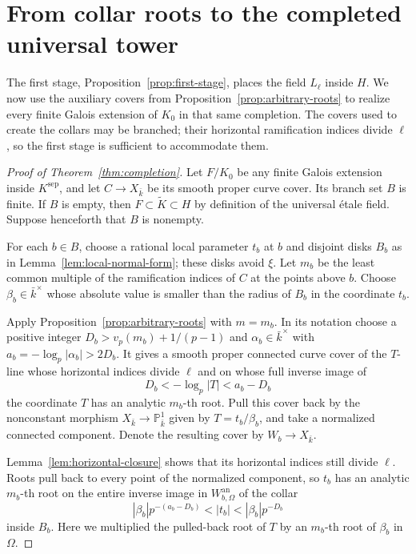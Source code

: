 \section{From collar roots to the completed universal tower}
\label{sec:realization}

The first stage, Proposition~\ref{prop:first-stage}, places the field
$L_\ell$ inside $H$.  We now use the auxiliary covers from
Proposition~\ref{prop:arbitrary-roots} to realize every finite Galois
extension of $K_0$ in that same completion.  The covers used to create
the collars may be branched; their horizontal ramification indices
divide $\ell$, so the first stage is sufficient to accommodate them.

\begin{proof}[Proof of Theorem~\ref{thm:completion}]
Let $F/K_0$ be any finite Galois extension inside $K^{\mathrm{sep}}$,
and let $C\to X_{\bar k}$ be its smooth proper curve cover.  Its branch
set $B$ is finite.  If $B$ is empty, then $F\subset\widetilde K\subset
H$ by definition of the universal étale field.  Suppose henceforth
that $B$ is nonempty.

For each $b\in B$, choose a rational local parameter $t_b$ at $b$ and
disjoint disks $B_b$ as in Lemma~\ref{lem:local-normal-form}; these
disks avoid $\xi$.  Let $m_b$ be the least common multiple of the
ramification indices of $C$ at the points above $b$.  Choose
$\beta_b\in\bar k^\times$ whose absolute value is smaller than the
radius of $B_b$ in the coordinate $t_b$.

Apply Proposition~\ref{prop:arbitrary-roots} with $m=m_b$.  In its
notation choose a positive integer $D_b>v_p(m_b)+1/(p-1)$ and
$\alpha_b\in\bar k^\times$ with
$a_b=-\log_p|\alpha_b|>2D_b$.  It gives a smooth proper connected
curve cover of the $T$-line whose horizontal indices divide $\ell$
and on whose full inverse image of
\[
                     D_b<-\log_p|T|<a_b-D_b
\]
the coordinate $T$ has an analytic $m_b$-th root.  Pull this cover back
by the nonconstant morphism $X_{\bar k}\to\mathbb P^1_{\bar k}$
given by $T=t_b/\beta_b$, and take a normalized connected component.
Denote the resulting cover by $W_b\to X_{\bar k}$.

Lemma~\ref{lem:horizontal-closure} shows that its horizontal indices
still divide $\ell$.  Roots pull back to every point of the normalized
component, so $t_b$ has an analytic $m_b$-th root on the entire inverse
image in $W_{b,\Omega}^{\mathrm{an}}$ of the collar
\[
 |\beta_b|p^{-(a_b-D_b)}<|t_b|<|\beta_b|p^{-D_b}
\]
inside $B_b$.  Here we multiplied the pulled-back root of $T$ by an
$m_b$-th root of $\beta_b$ in $\Omega$.


\end{proof}
